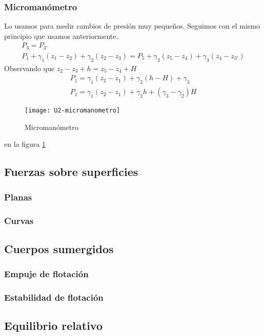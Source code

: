 \subsubsection{Micromanómetro}
Lo usamos para medir cambios de presión muy pequeños. Seguimos con el mismo principio que usamos anteriormente.
\begin{gather}
	P_{3}=P_{3'}\\
	P_{1} + \gamma_{1} (z_{1}-z_{2}) + \gamma_{2} (z_{2}-z_{3}) = P_{5} + \gamma_{2} (z_{5} - z_{4}) + \gamma_{3} (z_{4} - z_{3'})
\end{gather}
Observando que $z_{2}-z_{3} + h = z_{5} - z_{4} + H$
\begin{gather}
	P_{1} = \gamma_{1} (z_{2} - z_{1}) + \gamma_{2} (h- H) + \gamma_{3} \\
	P_{1} = \gamma_{1} (z_{2} - z_{1}) + \gamma_{2} h + (\gamma_{3} -\gamma_{2}) H
\end{gather}

\begin{figure}[h]
	\centering
	\texttt{[image: U2-micromanometro]}
	\caption{Micromanómetro}
	\label{micro}
\end{figure}
en la figura \ref{micro}
\subsection{Fuerzas sobre superficies}
\subsubsection{Planas}
\subsubsection{Curvas}

\subsection{Cuerpos sumergidos}

\subsubsection{Empuje de flotación}

\subsubsection{Estabilidad de flotación}

\subsection{Equilibrio relativo}	
